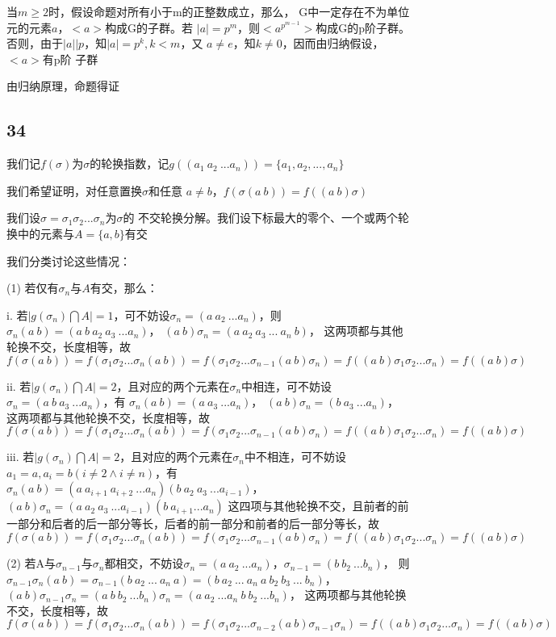 \documentclass[UTF8]{ctexart}
\begin{document}
当$m\geq 2$时，假设命题对所有小于m的正整数成立，那么，
G中一定存在不为单位元的元素$a$，$<a>$构成G的子群。若
$|a| = p^{m}$，则$<a^{p^{m-1}}>$构成G的p阶子群。
否则，由于$|a|\Big|p$，知$|a| = p^{k}, k < m$，又
$a\neq e$，知$k \neq 0$，因而由归纳假设，$<a>$有p阶
子群

由归纳原理，命题得证

\subsection*{34}

我们记$f(\sigma)$为$\sigma$的轮换指数，记$g((a_1\ a_2\ ... a_n)) = \{a_1, a_2, ..., a_n\}$

我们希望证明，对任意置换$\sigma$和任意
$a\neq b$，$f(\sigma (a\ b)) = f((a\ b)\sigma)$

我们设$\sigma = \sigma_1\sigma_2...\sigma_n$为$\sigma$的
不交轮换分解。我们设下标最大的零个、一个或两个轮换中的元素与$A=\{a, b\}$有交

我们分类讨论这些情况：

(1) 若仅有$\sigma_n$与$A$有交，那么：

i. 若$|g(\sigma_n)\bigcap A| = 1$，可不妨设$\sigma_n = (a\ a_2\ ... a_n)$，则
$\sigma_n(a\ b) = (a\ b\ a_2\ a_3\ ...a_n)$，
$(a\ b)\sigma_n = (a\ a_2\ a_3\ ...\ a_n\ b)$，
这两项都与其他轮换不交，长度相等，故$f(\sigma (a\ b)) = f(\sigma_1\sigma_2...\sigma_n(a\ b)) = f(\sigma_1\sigma_2...\sigma_{n-1}(a\ b)\sigma_n) = f((a\ b)\sigma_1\sigma_2...\sigma_n) = f((a\ b)\sigma)$

ii. 若$|g(\sigma_n)\bigcap A| = 2$，且对应的两个元素在$\sigma_n$中相连，可不妨设$\sigma_n = (a\ b\ a_3\ ... a_n)$，有
$\sigma_n(a\ b) = (a\ a_3\ ...a_n)$，
$(a\ b)\sigma_n = (b\ a_3\ ...a_n)$，
这两项都与其他轮换不交，长度相等，故$f(\sigma (a\ b)) = f(\sigma_1\sigma_2...\sigma_n(a\ b)) = f(\sigma_1\sigma_2...\sigma_{n-1}(a\ b)\sigma_n) = f((a\ b)\sigma_1\sigma_2...\sigma_n) = f((a\ b)\sigma)$

iii. 若$|g(\sigma_n)\bigcap A| = 2$，且对应的两个元素在$\sigma_n$中不相连，可不妨设$a_1 = a, a_i = b(i\neq 2\land i\neq n)$，有
$\sigma_n(a\ b) = (a\ a_{i+1}\ a_{i+2}\ ... a_n)(b\ a_2\ a_3\ ... a_{i-1})$，
$(a\ b)\sigma_n = (a\ a_2\ a_3\ ...a_{i-1})(b\ a_{i+1}...a_n)$
这四项与其他轮换不交，且前者的前一部分和后者的后一部分等长，后者的前一部分和前者的后一部分等长，故
$f(\sigma (a\ b)) = f(\sigma_1\sigma_2...\sigma_n(a\ b)) = f(\sigma_1\sigma_2...\sigma_{n-1}(a\ b)\sigma_n) = f((a\ b)\sigma_1\sigma_2...\sigma_n) = f((a\ b)\sigma)$

(2) 若A与$\sigma_{n-1}$与$\sigma_n$都相交，不妨设$\sigma_n = (a\ a_2\ ... a_n)$，$\sigma_{n-1} = (b\ b_2\ ... b_n)$，
则$\sigma_{n-1}\sigma_n(a\ b) = \sigma_{n-1}(b\ a_2\ ...\ a_n\ a) = (b\ a_2\ ...\ a_n\ a\ b_2\ b_3\ ...\ b_n)$，
$(a\ b)\sigma_{n-1}\sigma_n = (a\ b\ b_2\ ... b_n)\sigma_n = (a\ a_2\ ... a_n\ b\ b_2\ ...b_n)$，
这两项都与其他轮换不交，长度相等，故$f(\sigma (a\ b)) = f(\sigma_1\sigma_2...\sigma_n(a\ b)) = f(\sigma_1\sigma_2...\sigma_{n-2}(a\ b)\sigma_{n-1}\sigma_n) = f((a\ b)\sigma_1\sigma_2...\sigma_n) = f((a\ b)\sigma)$
\end{document}
